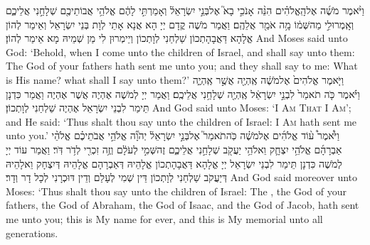 {וַיֹּ֨אמֶר מֹשֶׁ֜ה אֶל\maqqaf הָֽאֱלֹהִ֗ים הִנֵּ֨ה אָנֹכִ֣י בָא֮ אֶל\maqqaf בְּנֵ֣י יִשְׂרָאֵל֒ וְאָמַרְתִּ֣י לָהֶ֔ם אֱלֹהֵ֥י אֲבוֹתֵיכֶ֖ם שְׁלָחַ֣נִי אֲלֵיכֶ֑ם וְאָֽמְרוּ\maqqaf לִ֣י מַה\maqqaf שְּׁמ֔וֹ מָ֥ה אֹמַ֖ר אֲלֵהֶֽם׃}
{וַאֲמַר מֹשֶׁה קֳדָם יְיָ הָא אֲנָא אָתֵי לְוָת בְּנֵי יִשְׂרָאֵל וְאֵימַר לְהוֹן אֱלָהָא דַּאֲבָהָתְכוֹן שַׁלְחַנִי לְוָתְכוֹן וְיֵימְרוּן לִי מַן שְׁמֵיהּ מָא אֵימַר לְהוֹן׃}
{And Moses said unto God: ‘Behold, when I come unto the children of Israel, and shall say unto them: The God of your fathers hath sent me unto you; and they shall say to me: What is His name? what shall I say unto them?’}{}
{וַיֹּ֤אמֶר אֱלֹהִים֙ אֶל\maqqaf מֹשֶׁ֔ה אֶֽהְיֶ֖ה אֲשֶׁ֣ר אֶֽהְיֶ֑ה וַיֹּ֗אמֶר כֹּ֤ה תֹאמַר֙ לִבְנֵ֣י יִשְׂרָאֵ֔ל אֶֽהְיֶ֖ה שְׁלָחַ֥נִי אֲלֵיכֶֽם׃}
{וַאֲמַר יְיָ לְמֹשֶׁה אֶהְיֶה אֲשֶׁר אֶהְיֶה וַאֲמַר כִּדְנָן תֵּימַר לִבְנֵי יִשְׂרָאֵל אֶהְיֶה שַׁלְחַנִי לְוָתְכוֹן׃}
{And God said unto Moses: ‘\textsc{I Am That I Am}’; and He said: ‘Thus shalt thou say unto the children of Israel: \textsc{I Am} hath sent me unto you.’}{}
{וַיֹּ֩אמֶר֩ ע֨וֹד אֱלֹהִ֜ים אֶל\maqqaf מֹשֶׁ֗ה כֹּֽה\maqqaf תֹאמַר֮ אֶל\maqqaf בְּנֵ֣י יִשְׂרָאֵל֒ יְהֹוָ֞ה אֱלֹהֵ֣י אֲבֹתֵיכֶ֗ם אֱלֹהֵ֨י אַבְרָהָ֜ם אֱלֹהֵ֥י יִצְחָ֛ק וֵאלֹהֵ֥י יַעֲקֹ֖ב שְׁלָחַ֣נִי אֲלֵיכֶ֑ם זֶה\maqqaf שְּׁמִ֣י לְעֹלָ֔ם וְזֶ֥ה זִכְרִ֖י לְדֹ֥ר דֹּֽר׃}
{וַאֲמַר עוֹד יְיָ לְמֹשֶׁה כִּדְנָן תֵּימַר לִבְנֵי יִשְׂרָאֵל יְיָ אֱלָהָא דַּאֲבָהָתְכוֹן אֱלָהֵיהּ דְּאַבְרָהָם אֱלָהֵיהּ דְּיִצְחָק וֵאלָהֵיהּ דְּיַעֲקֹב שַׁלְחַנִי לְוָתְכוֹן דֵּין שְׁמִי לְעָלַם וְדֵין דּוּכְרָנִי לְכָל דָר וְדָר׃}
{And God said moreover unto Moses: ‘Thus shalt thou say unto the children of Israel: The \lord, the God of your fathers, the God of Abraham, the God of Isaac, and the God of Jacob, hath sent me unto you; this is My name for ever, and this is My memorial unto all generations.}{}
